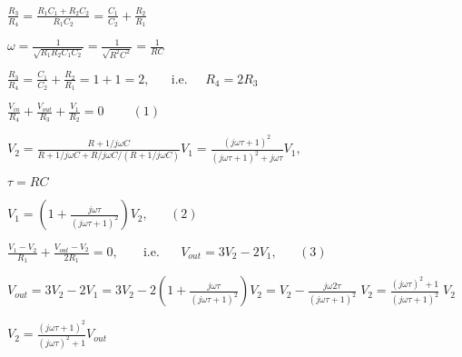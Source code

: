 \documentclass{article}
\def\lthtmlcheckvsize{\ifdim\ht\sizebox<\vsize 
  \ifdim\wd\sizebox<\hsize\expandafter\hfill\fi \expandafter\vfill
  \else\expandafter\vss\fi}%
\begin{document}
{\newpage\clearpage
{}%
$\displaystyle \frac{R_3}{R_4}=\frac{R_1C_1+R_2C_2}{R_1C_2}=\frac{C_1}{C_2}+\frac{R_2}{R_1}
$%
\lthtmlindisplaymathZ
\lthtmlcheckvsize\clearpage}

{\newpage\clearpage
{}%
$\displaystyle \omega=\frac{1}{\sqrt{R_1R_2C_1C_2}}
=\frac{1}{\sqrt{R^2C^2}}=\frac{1}{RC}
$%
\lthtmlindisplaymathZ
\lthtmlcheckvsize\clearpage}

{\newpage\clearpage
{}%
$\displaystyle \frac{R_3}{R_4}=\frac{C_1}{C_2}+\frac{R_2}{R_1}=1+1=2,
\;\;\;\;\;\;\mbox{i.e.}\;\;\;\;\;R_4=2R_3
$%
\lthtmlindisplaymathZ
\lthtmlcheckvsize\clearpage}

{\newpage\clearpage
{}%
$\displaystyle \frac{V_{in}}{R_4}+\frac{V_{out}}{R_3}+\frac{V_1}{R_2}=0\;\;\;\;\;\;\;\;(1)
  $%
\lthtmlindisplaymathZ
\lthtmlcheckvsize\clearpage}

{\newpage\clearpage
{}%
$\displaystyle V_2=\frac{R+1/j\omega C}{R+1/j\omega C+R/j\omega C/(R+1/j\omega C)}V_1
  =\frac{(j\omega\tau+1)^2}{(j\omega\tau+1)^2+j\omega\tau}V_1,
  $%
\lthtmlindisplaymathZ
\lthtmlcheckvsize\clearpage}

{\newpage\clearpage
{}%
$\tau=RC$%
\lthtmlindisplaymathZ
\lthtmlcheckvsize\clearpage}

{\newpage\clearpage
{}%
$\displaystyle V_1=\left(1+\frac{j\omega\tau}{(j\omega\tau+1)^2}\right)V_2,\;\;\;\;\;\;(2)
  $%
\lthtmlindisplaymathZ
\lthtmlcheckvsize\clearpage}

{\newpage\clearpage
{}%
$\displaystyle \frac{V_1-V_2}{R_1}+\frac{V_{out}-V_2}{2R_1}=0,
      \;\;\;\;\;\;\;\mbox{i.e.}\;\;\;\;\;\; V_{out}=3V_2-2V_1,\;\;\;\;\;\;(3)
  $%
\lthtmlindisplaymathZ
\lthtmlcheckvsize\clearpage}

{\newpage\clearpage
{}%
$\displaystyle V_{out}=3V_2-2V_1=3V_2-2\left(1+\frac{j\omega\tau}{(j\omega\tau+1)^2}\right)V_2
=V_2-\frac{j\omega 2\tau}{(j\omega\tau+1)^2}\;V_2
=\frac{(j\omega\tau)^2+1}{(j\omega\tau+1)^2}\;V_2
$%
\lthtmlindisplaymathZ
\lthtmlcheckvsize\clearpage}

{\newpage\clearpage
{}%
$\displaystyle V_2=\frac{(j\omega\tau+1)^2}{(j\omega\tau)^2+1}V_{out}
$%
\lthtmlindisplaymathZ
\lthtmlcheckvsize\clearpage}
\end{document}
